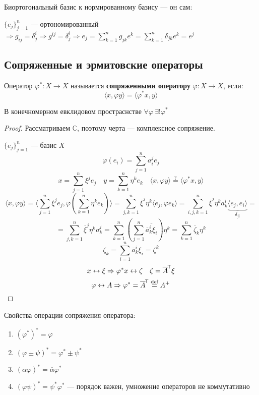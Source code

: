 \begin{remark}
    Биортогональный базис к нормированному базису --- он сам:

    $\{e_j\}_{j=1}^n$ --- ортономированный $\Rightarrow g_{ij}=\delta^i_j \Rightarrow g^{ij} = \delta^i_j \Rightarrow e_j=\sum_{k=1}^n g_{jk}e^k = \sum_{k=1}^n \delta_{jk} e^k = e^j$
\end{remark}

\subsection{Сопряженные и эрмитовские операторы}

\begin{definition}
    Оператор $\varphi^* : X \to X$ называется \textbf{сопряженными оператору} $\varphi : X \to X$, если: $$\langle x, \varphi y \rangle = \langle \varphi^* x , y \rangle$$
\end{definition}

\begin{theorem}
    В конечномерном евклидовом простраснстве $\forall \varphi \ \exists! \varphi^*$
\end{theorem}
\begin{proof}
    Рассматриваем $\mathbb{C}$, поэтому черта --- комплексное сопряжение.

    $\{e_j\}_{j=1}^n$ --- базис $X$
    $$\varphi(e_i) = \sum_{j=1}^n a_i^j e_j$$
    $$x = \sum_{j=1}^n \xi^j e_j \quad y = \sum_{k=1}^n \eta^k e_k \quad \langle x , \varphi y\rangle \stackrel{?}{=} \langle \varphi^* x, y \rangle$$
    $$\langle x, \varphi y \rangle = \langle \sum_{j=1}^n \xi^j e_j, \varphi\left(\sum_{k=1}^n \eta^k e_k\right)\rangle = \sum_{j,k=1}^n \overline \xi^j \eta^k \langle e_j, \varphi e_k\rangle = \sum_{i,j,k=1}^n \overline \xi^j \eta^k a_k^i \underbrace{\langle e_j, e_i\rangle}_{\delta_{ji}}=$$
    $$=\sum_{j,k=1}^n \overline\xi^j \eta^k a_k^j = \sum_{k=1}^n \left(\sum_{j=1}^n \overline{\overline a_k^i \xi_i }\right)\eta^k=\sum_{k=1}^n \overline \zeta_k\eta^k$$
    $$\zeta_k = \sum_{i=1}^n \overline a_k^i \xi_i = \zeta^k$$
    $$x\leftrightarrow \xi \Rightarrow \varphi^* x \leftrightarrow \zeta \quad \zeta = \overline A^{\mkern-1.5mu\mathsf{T}} \xi$$
    $$\varphi \leftrightarrow A \Rightarrow \varphi^* = \overline A^{\mkern-1.5mu\mathsf{T}} \stackrel{\text{def}}{=} A^+$$
\end{proof}

Свойства операции сопряжения оператора:
\begin{enumerate}
    \item $(\varphi^*)^* = \varphi$
    \item $(\varphi\pm\psi)^*=\varphi^*\pm\psi^*$
    \item $(\alpha \varphi)^* = \overline \alpha \varphi^*$
    \item $(\varphi\psi)^* = \psi^*\varphi^*$ --- порядок важен, умножение операторов не коммутативно
\end{enumerate}

